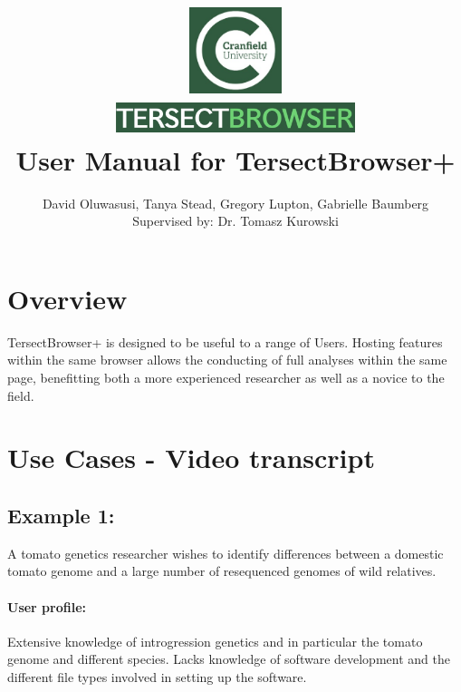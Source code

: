 \documentclass[12pt]{article}
\title{
{\includegraphics[width=3cm, height=2.5cm]{Cran.jpg}}
\\
\includegraphics[width=7cm, height=1cm]{TB.jpg}
\\
{User Manual for TersectBrowser+}
}
\author{David Oluwasusi, Tanya Stead, Gregory Lupton, Gabrielle Baumberg \\ Supervised by: Dr. Tomasz Kurowski}
\begin{document}
\sloppy %

\maketitle

\section{Overview}
TersectBrowser+ is designed to be useful to a range of Users. Hosting features within the same browser allows the conducting of full analyses within the same page, benefitting both a more experienced researcher as well as a novice to the field. 

\section{Use Cases - Video transcript}

\subsection{Example 1:} A tomato genetics researcher wishes to identify differences between a domestic tomato genome and a large number of resequenced genomes of wild relatives. 

\paragraph{User profile:} Extensive knowledge of introgression genetics and in particular the tomato genome and different species. Lacks knowledge of software development and the different file types involved in setting up the software. 
\end{document}
